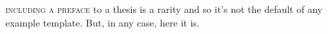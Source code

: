 \textsc{including a preface} to a thesis is a rarity and so it's not the default
of any example template. But, in any case, here it is.

